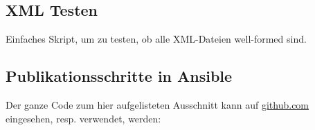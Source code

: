 \subsection{XML Testen}
Einfaches Skript, um zu testen, ob alle XML-Dateien well-formed sind.

\subsection{Publikationsschritte in Ansible}
Der ganze Code zum hier aufgelisteten Ausschnitt kann auf \href{https://github.com/bfh-semesterarbeit/spot-geoprocessing}{github.com} eingesehen, resp. verwendet, werden:


